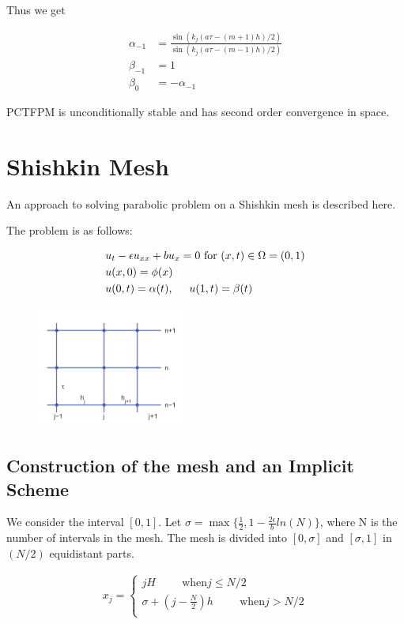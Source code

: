 Thus we get

\begin{align*}
 \alpha_{-1} &= \frac{\sin(k_{j}(a \tau -(m+1)h)/2)}{\sin(k_{j}(a \tau -(m-1)h)/2)}\\
 \beta_{-1} &= 1\\
 \beta_{0} &= -\alpha_{-1}
\end{align*}

PCTFPM is unconditionally stable and has second order convergence in space.


\section{Shishkin Mesh}

An approach to solving parabolic problem on a Shishkin mesh is described here.

The problem is as follows:

\begin{align*}
 &u_{t} - \epsilon u_{xx} + b u_{x} = 0 \text{ for } (x,t) \in \Omega = (0,1)\\
 &u(x,0) = \phi(x)\\
 &u(0,t) = \alpha(t), \hspace{5mm} u(1,t) = \beta(t)
\end{align*}

\begin{figure}[htbp]
	\centering
		\includegraphics[height=4cm]{Figures/shiskin.png}\\
	\caption[RCTFPM imaginary part]{}
\end{figure}

\subsection{Construction of the mesh and an Implicit Scheme}
We consider the interval $[0,1]$. Let $\sigma = \max\{\frac{1}{2},1-\frac{2 \epsilon}{b}ln(N)\}$, where N is the number
of intervals in the mesh. The mesh is divided into $[0,\sigma]$ and $[\sigma,1]$ in $(N/2)$ equidistant parts.

\begin{align*}
x_{j} = \begin{cases} 
	    jH \hspace{1cm} \text{when} j \leq N/2\\
	    \sigma + (j-\frac{N}{2})h \hspace{1cm} \text{when} j>N/2\\
	 \end{cases}
\end{align*}

